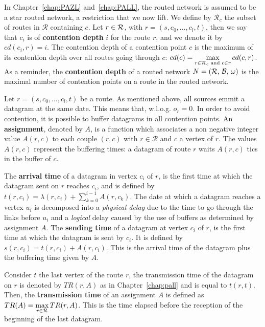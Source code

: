 In Chapter~\ref{chap:PAZL} and~\ref{chap:PALL}, the routed network is assumed to be a star routed network, a restriction that we now lift.
We define by $\mathcal{R}_c$ the subset of routes in $\mathcal{R}$ containing $c$. Let $r \in {\cal R}$, with $r = (s,c_0,\dots,c_l,t)$, then we say that $c_i$ is of \textbf{contention depth} $i$ for the route $r$, and we denote it by $cd(c_i,r) = i$. The contention depth of a contention point $c$ is the maximum of its contention depth over all routes going through $c$: $cd(c) = \max\limits_{r\in{\cal R}_c \text{ and } c \in r} cd(c,r)$. 
As a reminder, the \textbf{contention depth} of a routed network $N = ({\cal R},\,{\cal B},\,\omega)$ is the maximal number of contention points on a route in the routed network. 


   Let $r=(s,c_0,\dots,c_l,t)$ be a route. As mentioned above, all sources emmit a datagram at the same date. This means that, w.l.o.g. $o_r = 0$. In order to avoid contention, it is possible to buffer datagrams in all contention points. An \textbf{assignment}, denoted by  $A$, is a function which associates a non negative integer value $A(r,c)$ to each couple $(r,c)$ with $r \in \mathcal{R}$ and $c$ a vertex of $r$. The values $A(r,c)$ represent the buffering times: a datagram of route $r$ waits $A(r,c)$ tics in the buffer of $c$.
          
       

 The \textbf{arrival time} of a datagram in vertex $c_i$ of $r$, is the first time at which the datagram sent on $r$ reaches $c_i$, and is defined by $t(r,c_i) = \lambda(r,c_i) + \sum_{k=0}^{i-1} A(r,c_k) $. The date at which a datagram reaches a vertex $u_i$ is decomposed into a \emph{physical delay} due to the time to go through the links before $u_i$ and a \emph{logical} delay caused by the use of buffers as determined by assignment $A$.
  The \textbf{sending time} of a datagram at vertex $c_i$ of $r$, is the first time at which the datagram is sent by $c_i$. It is defined by $s(r,c_i) = t(r,c_i) +  A(r,c_i) $. This is the arrival time of the datagram plus the buffering time given by $A$.
 
  Consider $t$ the last vertex of the route $r$, the transmission time of the datagram on 
  $r$ is denoted by $TR(r,A)$ as in Chapter~\ref{chap:pall} and is equal to $t(r,t)$. Then, the \textbf{transmission time} of an assignment $A$ is defined as $TR(A) = \displaystyle \max\limits_{r \in {\cal R}} TR(r,A) $. This is the time elapsed before the reception of the beginning of the last datagram. 

